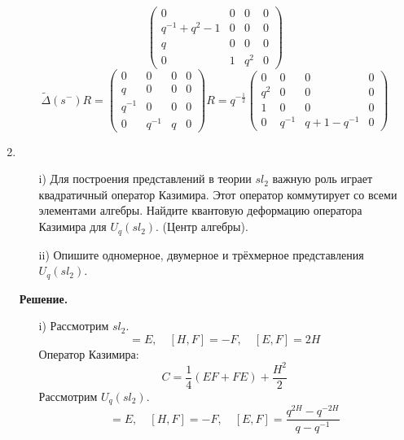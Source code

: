 \documentclass[12pt]{article}
\theoremstyle{definition}
\begin{document}
\begin{enumerate}
\begin{equation}
\begin{pmatrix}
            0 & 0 & 0 & 0\\
            q^{-1}+q^2-1 & 0 & 0 & 0\\
            q & 0 & 0 & 0\\
            0 & 1 & q^2 & 0
        \end{pmatrix}
    \end{equation}
    \begin{equation}
        \tilde\Delta(s^-)R=\begin{pmatrix}
            0 & 0 & 0 & 0\\
            q & 0 & 0 & 0\\
            q^{-1} & 0 & 0 & 0\\
            0 & q^{-1} & q & 0
        \end{pmatrix}R=q^{-\frac{1}{2}}\begin{pmatrix}
            0 & 0 & 0 & 0\\
            q^2 & 0 & 0 & 0\\
            1 & 0 & 0 & 0\\
            0 & q^{-1} & q+1-q^{-1} & 0
        \end{pmatrix}
    \end{equation}
    \item
    \begin{itemize}
        \item[i)] Для построения представлений в теории $sl_2$ важную роль играет квадратичный оператор Казимира. Этот оператор коммутирует со всеми элементами алгебры. Найдите квантовую деформацию оператора Казимира для $U_q(sl_2)$. (Центр алгебры).
        \item[ii)] Опишите одномерное, двумерное и трёхмерное представления $U_q(sl_2)$.
    \end{itemize}
    \textbf{Решение.}
    \begin{itemize}
        \item[i)] Рассмотрим $sl_2$.
        \begin{equation}
            [H,E]=E,\quad [H,F]=-F,\quad [E,F]=2H
        \end{equation}
        Оператор Казимира:
        \begin{equation}
            C=\frac{1}{4}(EF+FE)+\frac{H^2}{2}
        \end{equation}
        Рассмотрим $U_q(sl_2)$.
        \begin{equation}
            [H,E]=E,\quad [H,F]=-F,\quad [E,F]=\frac{q^{2H}-q^{-2H}}{q-q^{-1}}
        \end{equation}

\end{itemize}
\end{enumerate}
\end{document}
